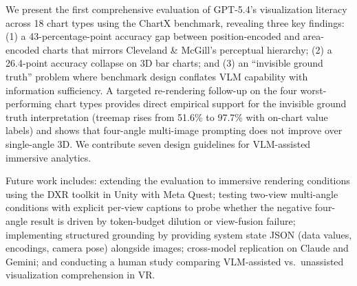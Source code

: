\documentclass[sigconf, 10pt]{acmart}
\begin{document}
We present the first comprehensive evaluation of GPT-5.4's visualization literacy across 18 chart types using the ChartX benchmark, revealing three key findings: (1) a 43-percentage-point accuracy gap between position-encoded and area-encoded charts that mirrors Cleveland \& McGill's perceptual hierarchy; (2) a 26.4-point accuracy collapse on 3D bar charts; and (3) an ``invisible ground truth'' problem where benchmark design conflates VLM capability with information sufficiency. A targeted re-rendering follow-up on the four worst-performing chart types provides direct empirical support for the invisible ground truth interpretation (treemap rises from 51.6\% to 97.7\% with on-chart value labels) and shows that four-angle multi-image prompting does not improve over single-angle 3D. We contribute seven design guidelines for VLM-assisted immersive analytics.

Future work includes: extending the evaluation to immersive rendering conditions using the DXR toolkit in Unity with Meta Quest; testing two-view multi-angle conditions with explicit per-view captions to probe whether the negative four-angle result is driven by token-budget dilution or view-fusion failure; implementing structured grounding by providing system state JSON (data values, encodings, camera pose) alongside images; cross-model replication on Claude and Gemini; and conducting a human study comparing VLM-assisted vs.\ unassisted visualization comprehension in VR.

\end{document}
